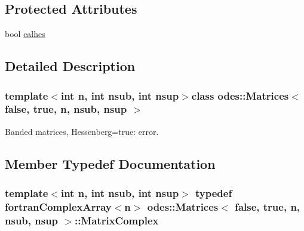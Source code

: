 \subsection*{Protected Attributes}
\begin{DoxyCompactItemize}
\item 
bool \hyperlink{classodes_1_1Matrices_3_01false_00_01true_00_01n_00_01nsub_00_01nsup_01_4_a69754fb4b71b97a43059ba4cd1d1afee}{calhes}
\end{DoxyCompactItemize}


\subsection{Detailed Description}
\subsubsection*{template$<$int n, int nsub, int nsup$>$class odes\+::\+Matrices$<$ false, true, n, nsub, nsup $>$}

Banded matrices, Hessenberg=true\+: error. 

\subsection{Member Typedef Documentation}
\hypertarget{classodes_1_1Matrices_3_01false_00_01true_00_01n_00_01nsub_00_01nsup_01_4_ab1d809758e20fa3ef210700989a47fa0}{}
\subsubsection[{Matrix\+Complex}]{\setlength{\rightskip}{0pt plus 5cm}template$<$int n, int nsub, int nsup$>$ typedef {\bf fortran\+Complex\+Array}$<$n$>$ {\bf odes\+::\+Matrices}$<$ false, true, n, nsub, nsup $>$\+::{\bf Matrix\+Complex}}\label{classodes_1_1Matrices_3_01false_00_01true_00_01n_00_01nsub_00_01nsup_01_4_ab1d809758e20fa3ef210700989a47fa0}
\hypertarget{classodes_1_1Matrices_3_01false_00_01true_00_01n_00_01nsub_00_01nsup_01_4_a63af1e92e4c06d6986909d7af6a9c0b9}{}
